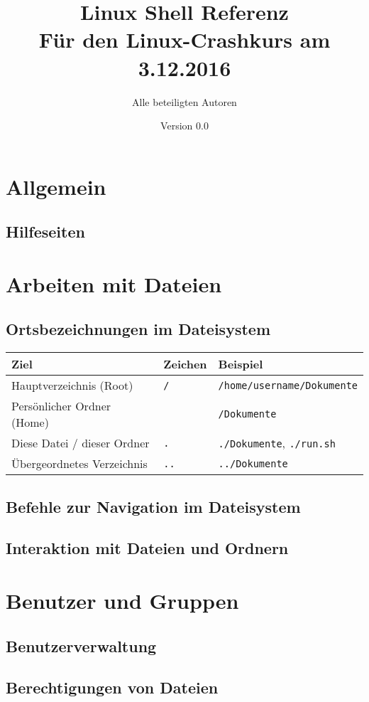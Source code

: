 \documentclass[11pt]{article}
\title{\textbf{Linux Shell Referenz}\\Für den Linux-Crashkurs am 3.12.2016}
\author{Alle beteiligten Autoren}
\date{Version 0.0}
\newcommand{\textapprox}{\raisebox{0.5ex}{\texttildelow}}
\begin{document}
\maketitle

\section {Allgemein}

\subsection {Hilfeseiten}

\section {Arbeiten mit Dateien}

\subsection {Ortsbezeichnungen im Dateisystem}

\begin{tabularx}{1\textwidth}{|l|l|X|}
\hline
\textbf{Ziel} & \textbf{Zeichen} & \textbf{Beispiel} \\
\hline
Hauptverzeichnis (Root) & \lstinline$/$ & \lstinline$/home/username/Dokumente$ \\
Persönlicher Ordner (Home) & \textapprox & \textapprox\lstinline$/Dokumente$ \\
Diese Datei / dieser Ordner & \lstinline$.$ & \lstinline$./Dokumente$, \lstinline$./run.sh$ \\
Übergeordnetes Verzeichnis & \lstinline$..$ & \lstinline$../Dokumente$ \\
\hline
\end{tabularx}

\subsection {Befehle zur Navigation im Dateisystem}

\subsection {Interaktion mit Dateien und Ordnern}

\section {Benutzer und Gruppen}

\subsection {Benutzerverwaltung}

\subsection {Berechtigungen von Dateien}
\end{document}
